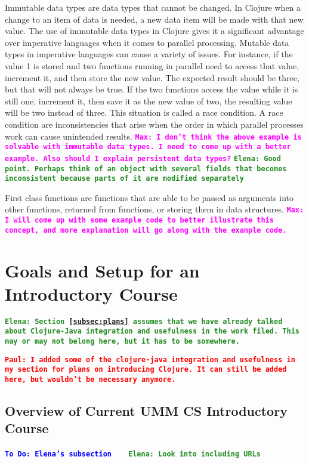 \documentclass[12pt]{article}
\newcommand{\comment}[1]{{\bf \tt  {#1}}}
\newcommand{\emcomment}[1]{\textcolor{ForestGreen}{\comment{Elena: {#1}}}}
\newcommand{\todo}[1]{\textcolor{blue}{\comment{To Do: {#1}}}}
\newcommand{\pscomment}[1]{\textcolor{red}{\comment{Paul: {#1}}}}
\newcommand{\mmcomment}[1]{\textcolor{magenta}{\comment{Max: {#1}}}}
\begin{document}
Immutable data types are data types that cannot be changed. In Clojure when a change to an item of data is needed, a new data item will be made with that new value. The use of immutable data types in Clojure gives it a significant advantage over imperative languages when it comes to parallel processing. Mutable data types in imperative languages can cause a variety of issues. For instance, if the value 1 is stored and two functions running in parallel need to access that value, increment it, and then store the new value. The expected result should be three, but that will not always be true. If the two functions access the value while it is still one, increment it, then save it as the new value of two, the resulting value will be two instead of three. This situation is called a race condition. A race condition are inconsistencies that arise when the order in which parallel processes work can cause unintended results.
\mmcomment{I don't think the above example is solvable with immutable data types. I need to come up with a better example. Also should I explain persistent data types?}
\emcomment{Good point. Perhaps think of an object with several fields that becomes inconsistent because parts of it are modified separately}

First class functions are functions that are able to be passed as arguments into other functions, returned from functions, or storing them in data structures.
\mmcomment{I will come up with some example code to better illustrate this concept, and more explanation will go along with the example code.}   

\section{Goals and Setup for an Introductory Course}\label{sec:racket-clojure}
\emcomment{Section~\ref{subsec:plans} assumes that we have already talked about Clojure-Java integration and usefulness in the work filed. This may or may not belong here, but it has to be somewhere.}

\pscomment{I added some of the clojure-java integration and usefulness in my section for plans on introducing Clojure.  It can still be added here, but wouldn't be necessary anymore.}

\subsection{Overview of Current UMM CS Introductory Course}\label{subsec:course}
\todo{Elena's subsection}
~\cite{htdp}
~\cite{lein} \emcomment{Look into including URLs}
\end{document}
